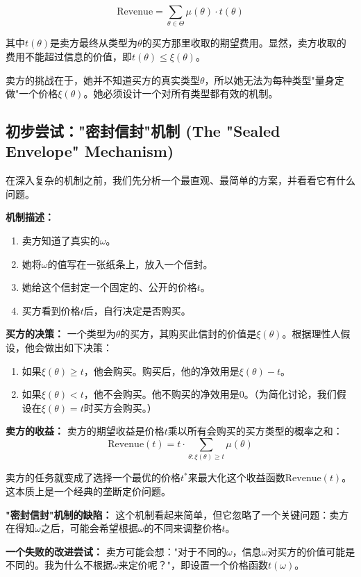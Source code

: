$$\text{Revenue} = \sum\limits_{\theta\in\Theta}\mu(\theta)\cdot t(\theta)$$

其中$t(\theta)$是卖方最终从类型为$\theta$的买方那里收取的期望费用。显然，卖方收取的费用不能超过信息的价值，即$t(\theta)\leq\xi(\theta)$。

卖方的挑战在于，她并不知道买方的真实类型$\theta$，所以她无法为每种类型"量身定做"一个价格$\xi(\theta)$。她必须设计一个对所有类型都有效的机制。
  
\subsection{初步尝试："密封信封"机制 (The "Sealed Envelope" Mechanism)}

在深入复杂的机制之前，我们先分析一个最直观、最简单的方案，并看看它有什么问题。

\textbf{机制描述：}
\begin{enumerate}
    \item 卖方知道了真实的$\omega$。
    \item 她将$\omega$的值写在一张纸条上，放入一个信封。
    \item 她给这个信封定一个固定的、公开的价格$t$。
    \item 买方看到价格$t$后，自行决定是否购买。
\end{enumerate}

\textbf{买方的决策：}
一个类型为$\theta$的买方，其购买此信封的价值是$\xi(\theta)$。根据理性人假设，他会做出如下决策：
\begin{enumerate}
    \item 如果$\xi(\theta)\geq t$，他会购买。购买后，他的净效用是$\xi(\theta)-t$。
    \item 如果$\xi(\theta)<t$，他不会购买。他不购买的净效用是0。（为简化讨论，我们假设在$\xi(\theta)=t$时买方会购买。）
\end{enumerate}

\textbf{卖方的收益：}
卖方的期望收益是价格$t$乘以所有会购买的买方类型的概率之和：
$$\text{Revenue}(t) = t\cdot \sum\limits_{\theta: \xi(\theta)\geq t}\mu(\theta)$$

卖方的任务就变成了选择一个最优的价格$t^*$来最大化这个收益函数$\text{Revenue}(t)$。这本质上是一个经典的垄断定价问题。

\textbf{"密封信封"机制的缺陷：}
这个机制看起来简单，但它忽略了一个关键问题：卖方在得知$\omega$之后，可能会希望根据$\omega$的不同来调整价格$t$。

\textbf{一个失败的改进尝试：}
卖方可能会想："对于不同的$\omega$，信息$\omega$对买方的价值可能是不同的。我为什么不根据$\omega$来定价呢？"，即设置一个价格函数$t(\omega)$。

